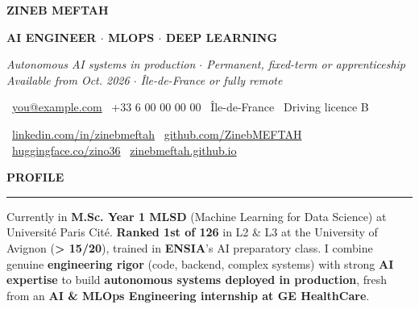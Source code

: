 \documentclass[10pt, a4paper]{article}
\newcommand{\headfont}{\sffamily}
\newlength{\mainInner}\setlength{\mainInner}{\textwidth}
\providecommand{\cvFit}{1.0}
\newlength{\cvgap}
\newcommand{\vgap}[1]{\setlength{\cvgap}{#1}\vspace{\cvFit\cvgap}}
\newcommand{\mainSection}[1]{%
  \vgap{6pt}%
  {\headfont\color{sectionColor}\fontsize{10pt}{11.5pt}\selectfont\bfseries\MakeUppercase{#1}}\par%
  \nointerlineskip\vgap{2pt}%
  {\color{ruleColor}\rule{\mainInner}{0.8pt}}\par\vgap{4pt}%
}
\newcommand{\ic}[1]{\makebox[4.2mm][l]{\color{gold}#1}\ }
\begin{document}
\begin{lrbox}{\cvMainBox}%
\begin{minipage}[t]{\mainInner}

  {\headfont\fontsize{27pt}{30pt}\selectfont\bfseries ZINEB MEFTAH}\par\vspace{5pt}
  {\headfont\color{accent}\fontsize{12.5pt}{16pt}\selectfont\bfseries
    AI ENGINEER {\color{mutedText}$\cdot$} MLOPS {\color{mutedText}$\cdot$} DEEP LEARNING}\par\vspace{3pt}
  {\color{subtitleColor}\fontsize{9.5pt}{13pt}\selectfont\itshape
    Autonomous AI systems in production $\cdot$ Permanent, fixed-term or apprenticeship\\
    Available from Oct. 2026 $\cdot$ Île-de-France or fully remote}\par\vspace{5pt}

  {\fontsize{9pt}{13pt}\selectfont
    \ic{\faEnvelope}\href{mailto:you@example.com}{you@example.com}\hfill
    \ic{\faPhone}+33 6 00 00 00 00\hfill
    \ic{\faMapMarker}Île-de-France\hfill
    \ic{\faCar}Driving licence B\par\vspace{2pt}
    \ic{\faLinkedin}\href{https://www.linkedin.com/in/zinebmeftah}{linkedin.com/in/zinebmeftah}\hfill
    \ic{\faGithub}\href{https://github.com/ZinebMEFTAH}{github.com/ZinebMEFTAH}\hfill
    \ic{\faRobot}\href{https://huggingface.co/zino36}{huggingface.co/zino36}\hfill
    \ic{\faGlobe}\href{https://zinebmeftah.github.io}{zinebmeftah.github.io}\par
  }
  \vgap{4pt}

  \mainSection{Profile}
  {\fontsize{9.5pt}{14pt}\selectfont
Currently in \textbf{M.Sc. Year 1 MLSD} (Machine Learning for Data Science) at Université Paris Cité. \textbf{Ranked 1st of 126} in L2 \& L3 at the University of Avignon (\textbf{> 15/20}), trained in \textbf{ENSIA}'s AI preparatory class. I combine genuine \textbf{engineering rigor} (code, backend, complex systems) with strong \textbf{AI expertise} to build \textbf{autonomous systems deployed in production}, fresh from an \textbf{AI \& MLOps Engineering internship at GE HealthCare}.
  }
  \vspace{5pt}


\end{minipage}
\end{lrbox}
\end{document}

